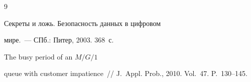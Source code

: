    {\small\frenchspacing

{%


\begin{thebibliography}{9}

    


     Секреты и ложь. Безопасность данных в цифровом 

мире.~--- СПб.: Питер, 2003. 368~с.



 \label{end\stat}

 


     The busy period of an $M/G/1$ 

queue with customer impatience~/\!\!/ J.~Appl. Prob., 2010. Vol.~47. P.~130--145.

 \end{thebibliography}

}

}

